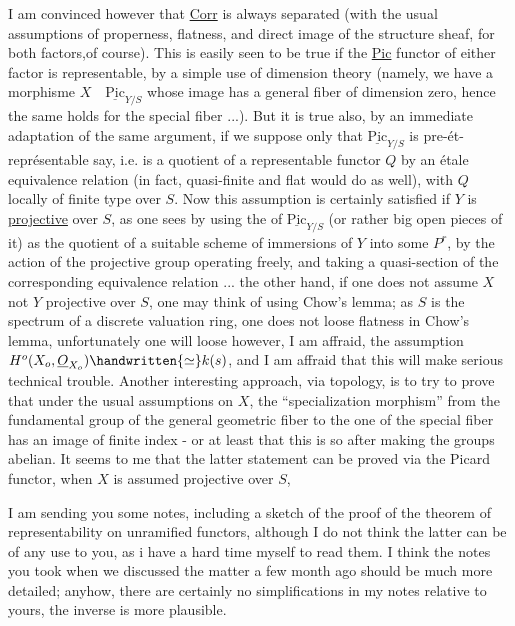 I am convinced however that \uline{Corr} is always separated (with the usual assumptions of properness, flatness, and direct image of the structure sheaf, for both factors,of course). This is easily seen to be true if the \uline{Pic} functor of either factor is representable, by a simple use of dimension theory (namely, we have a morphisme $X\quad\underline{\mathrm{Pic}}_{Y/S}$ whose image has a general fiber of dimension zero, hence the same holds for the special fiber ...). But it is true also, by an immediate adaptation of the same argument, if we suppose only that $\underline{\mathrm{Pic}}_{Y/S}$ is pre-ét-représentable say, i.e. is a quotient of a representable functor $Q$ by an étale equivalence relation (in fact, quasi-finite and flat would do as well), with $Q$ locally of finite type over $S$. Now this assumption is certainly satisfied if $Y$ is \uline{projective} over $S$, as one sees by using the  of $\underline{\mathrm{Pic}}_{Y/S}$ (or rather big open pieces of it) as the quotient of a suitable scheme of immersions of $Y$ into some $P^{r}$, by the action of the projective group operating freely, and taking a quasi-section of the corresponding equivalence relation ...  the other hand, if one does not assume $X$ not $Y$ projective over $S$, one may think of using Chow's lemma; as $S$ is the spectrum of a discrete valuation ring, one does not loose flatness in  Chow's lemma, unfortunately one will loose however, I am affraid, the assumption $H^{o}(X_{o},\underline{O}_{X_{o}})\handwritten{\simeq}k(s)$, and I am affraid that this will make serious technical trouble. Another interesting approach, via topology, is to try to prove that under the usual assumptions on $X$, the ``specialization morphism'' from the fundamental group of the general geometric fiber to the one of the special fiber has an image of finite index - or at least that this is so after
making the groups abelian. It seems to me that the latter statement can be proved via the Picard functor, when $X$ is assumed projective over $S$,

I am sending you some notes, including a sketch of the proof of the theorem of representability on unramified functors, although I do not think the latter can be of any use to you, as i have a hard time myself to read them. I think the notes you took when we discussed the matter a few month ago should be much more detailed; anyhow, there are certainly no simplifications in my notes relative to yours, the inverse is more plausible.

